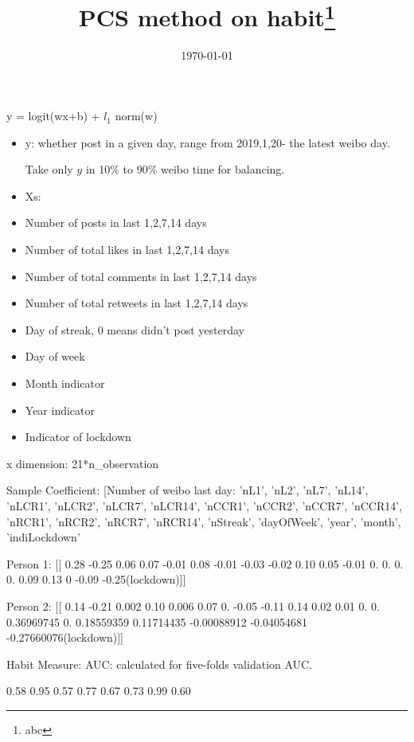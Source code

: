 \documentclass[12pt]{article}
\begin{document}
\begin{titlepage}
\title{PCS method on habit\thanks{abc}}
\date{\today}
\maketitle

\setcounter{page}{0}
\thispagestyle{empty}
\end{titlepage}
\pagebreak \newpage
y = logit(wx+b) + $l_1$ norm(w)

\begin{itemize}
\item y: whether post in a given day, range from 
2019,1,20- the latest weibo day.

Take only $y$ in 10\% to 90\% weibo time for balancing.
\item Xs:
    \item Number of posts in last 1,2,7,14 days
    \item Number of total likes in last 1,2,7,14 days
    \item Number of total comments in last 1,2,7,14 days
    \item Number of total retweets in last 1,2,7,14 days
    \item Day of streak, 0 means didn't post yesterday
    \item Day of week
    \item Month indicator
    \item Year indicator
    \item Indicator of lockdown
\end{itemize}

x dimension: 21*n\_observation

Sample Coefficient:
[Number of weibo last day: 'nL1', 'nL2', 'nL7', 'nL14', 'nLCR1', 'nLCR2', 'nLCR7',
       'nLCR14', 'nCCR1', 'nCCR2', 'nCCR7', 'nCCR14', 'nRCR1', 'nRCR2',
       'nRCR7', 'nRCR14', 'nStreak', 'dayOfWeek', 'year', 'month',
       'indiLockdown'
       
Person 1: [[ 0.28 -0.25  0.06  0.07 -0.01  0.08
  -0.01 -0.03 -0.02  0.10  0.05 -0.01
   0.  0.  0.  0.  0.09  0.13
  0 -0.09 -0.25(lockdown)]]

Person 2:
[[ 0.14 -0.21 0.002  0.10  0.006  0.07
   0. -0.05 -0.11 0.14  0.02  0.01
   0. 0. 0.36969745  0.          0.18559359  0.11714435
  -0.00088912 -0.04054681 -0.27660076(lockdown)]]


Habit Measure:
AUC: calculated for five-folds validation AUC.

0.58
0.95
0.57
0.77
0.67
0.73
0.99
0.60
\doublespacing
\end{document}
